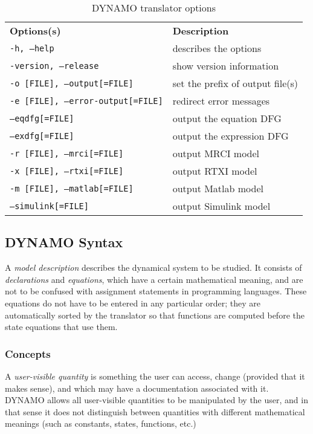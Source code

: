 \begin{table}[htdp]
\caption{DYNAMO translator options}
\begin{center}
\vspace{.5cm}
\begin{tabular}{ll}
\textbf{Options(s)} & \textbf{Description}\\
\texttt{-h,  --help} & describes the options\\
\texttt{-version, --release} & show version information\\
\texttt{-o [FILE],  --output[=FILE]} & set the prefix of output file(s)\\
\texttt{-e [FILE],  --error-output[=FILE]} & redirect error messages\\
\texttt{--eqdfg[=FILE]} & output the equation DFG\\
\texttt{--exdfg[=FILE]} & output the expression DFG\\
\texttt{-r [FILE],  --mrci[=FILE]} & output MRCI model\\
\texttt{-x [FILE],  --rtxi[=FILE]} & output RTXI model\\
\texttt{-m [FILE],  --matlab[=FILE]} & output Matlab model\\
\texttt{--simulink[=FILE]} & output Simulink model\\
\end{tabular}
\end{center}
\label{default}
\end{table}%

\subsection{DYNAMO Syntax}

A \emph{model description} describes the dynamical system to be
studied. It consists of \emph{declarations} and \emph{equations}, which
have a certain mathematical meaning, and are not to be confused with
assignment statements in programming languages. These equations do not
have to be entered in any particular order; they are automatically
sorted by the translator so that functions are computed before the
state equations that use them.

\subsubsection{Concepts}

A \emph{user-visible quantity} is something the user can access, change
(provided that it makes sense), and which may have a documentation
associated with it. DYNAMO allows all user-visible quantities to be
manipulated by the user, and in that sense it does not distinguish
between quantities with different mathematical meanings (such as
constants, states, functions, etc.)

